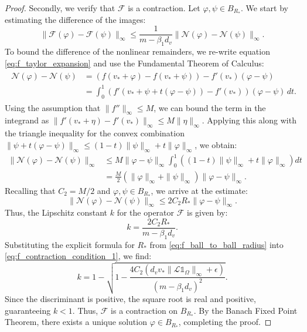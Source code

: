 \documentclass[11pt, a4paper]{article}
\theoremstyle{break}
\theoremstyle{break}
\theoremstyle{break}
\theoremstyle{break}
\theoremstyle{break}
\theoremstyle{break}
\theoremstyle{break}
\theoremstyle{break}
\theoremstyle{break}
\theoremstyle{break}
\begin{document}
\begin{proof}
    Secondly, we verify that $\mathcal{F}$ is a contraction. Let $\varphi, \psi \in B_{R_*}$. We start by estimating the difference of the images:
    \begin{equation}
        \| \mathcal{F}(\varphi) - \mathcal{F}(\psi) \|_\infty 
        \leq \frac{1}{m - \beta_1 d_v} \| \mathcal{N}(\varphi) - \mathcal{N}(\psi) \|_\infty.
    \end{equation}
    To bound the difference of the nonlinear remainders, we re-write equation \eqref{eq:f_taylor_expansion} and use the Fundamental Theorem of Calculus:
    \begin{align}
        \begin{split}
            \mathcal{N}(\varphi) - \mathcal{N}(\psi) 
            &= \left( f(v_* + \varphi) - f(v_* + \psi) \right)  - f'(v_*) (\varphi - \psi)\\
            &=
            \int_0^1 \left( f'(v_* + \psi + t(\varphi - \psi)) - f'(v_*) \right) (\varphi - \psi) \, dt.
        \end{split}
    \end{align}
    Using the assumption that $\|f''\|_\infty \leq M$, we can bound the term in the integrand as $\|f'(v_* + \eta) - f'(v_*)\|_\infty \leq M \|\eta\|_\infty$. Applying this along with the triangle inequality for the convex combination $\|\psi + t(\varphi - \psi)\|_\infty \leq (1-t)\|\psi\|_\infty + t\|\varphi\|_\infty$, we obtain:
    \begin{align}
        \| \mathcal{N}(\varphi) - \mathcal{N}(\psi) \|_\infty 
        &\leq M \|\varphi - \psi\|_\infty \int_0^1 \left( (1-t)\|\psi\|_\infty + t\|\varphi\|_\infty \right) dt \\
        &= \frac{M}{2} (\|\varphi\|_\infty + \|\psi\|_\infty) \|\varphi - \psi\|_\infty.
    \end{align}
    Recalling that $C_2 = M/2$ and $\varphi, \psi \in B_{R_*}$, we arrive at the estimate:
    \begin{equation}
        \| \mathcal{N}(\varphi) - \mathcal{N}(\psi) \|_\infty \leq 2 C_2 R_* \|\varphi - \psi\|_\infty.
    \end{equation}
    Thus, the Lipschitz constant $k$ for the operator $\mathcal{F}$ is given by:
    \begin{equation}
        \label{eq:f_contraction_condition_1}
        k = \frac{2 C_2 R_*}{m - \beta_1 d_v}.
    \end{equation}
    Substituting the explicit formula for $R_*$ from \eqref{eq:f_ball_to_ball_radius} into \eqref{eq:f_contraction_condition_1}, we find:
    \begin{equation}
        \label{eq:f_contraction_condition_2}
        k = 1 - 
        \sqrt{ 
        1 
        -
        \frac{4 C_2 (d_v v_* \|\mathcal{L}\mathds{1}_\Omega\|_\infty + \epsilon)}{(m - \beta_1 d_v)^2}
        }.
    \end{equation}
    Since the discriminant is positive, the square root is real and positive, guaranteeing $k < 1$. Thus, $\mathcal{F}$ is a contraction on $B_{R_*}$. By the Banach Fixed Point Theorem, there exists a unique solution $\varphi \in B_{R_*}$, completing the proof.
\end{proof}
\end{document}
